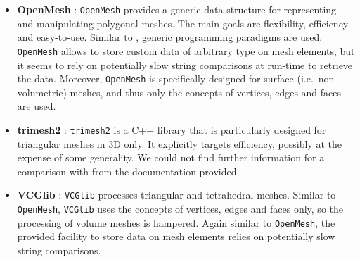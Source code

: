 \begin{itemize}
  \item \textbf{OpenMesh} \cite{OpenMesh}: \texttt{OpenMesh} provides a generic data structure for representing and manipulating polygonal meshes.
        The main goals are flexibility, efficiency and easy-to-use.
        Similar to {\ViennaGrid}, generic programming paradigms are used.
        \texttt{OpenMesh} allows to store custom data of arbitrary type on mesh elements, but it seems to rely on potentially slow string comparisons at run-time to retrieve the data.
        Moreover, \texttt{OpenMesh} is specifically designed for surface (i.e.~non-volumetric) meshes, and thus only the concepts of vertices, edges and faces are used.

  \item \textbf{trimesh2} \cite{trimesh2}: \texttt{trimesh2} is a C++ library that is particularly designed for triangular meshes in 3D only.
        It explicitly targets efficiency, possibly at the expense of some generality.
        We could not find further information for a comparison with {\ViennaGrid} from the documentation provided.

  \item \textbf{VCGlib} \cite{VCGlib}: \texttt{VCGlib} processes triangular and tetrahedral meshes.
        Similar to \texttt{OpenMesh}, \texttt{VCGlib} uses the concepts of vertices, edges and faces only, so the processing of volume meshes is hampered.
        Again similar to \texttt{OpenMesh}, the provided facility to store data on mesh elements relies on potentially slow string comparisons.
\end{itemize}




